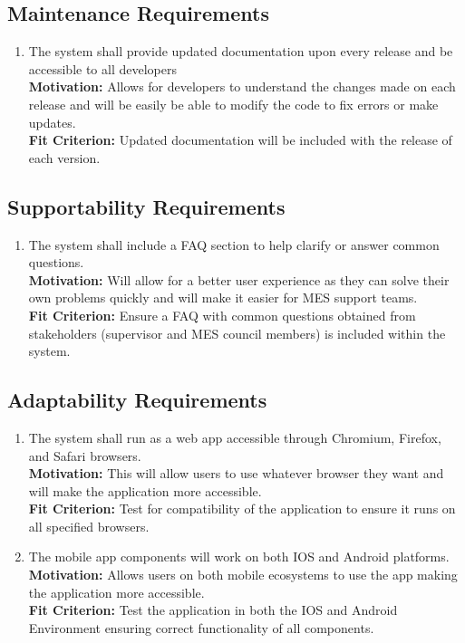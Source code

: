 \documentclass[12pt]{article}
\begin{document}
\subsection{Maintenance Requirements}
\begin{enumerate}[align=left,
  leftmargin=*,
  labelsep=1em,
  itemindent=0em,
  label=\bfseries MT-\arabic*:]
  \item The system shall provide updated documentation upon every release and be accessible to all developers\\[2mm]
    {\bf Motivation:} Allows for developers to understand the changes made on each release and will be easily be able to modify the code to fix errors or make updates. \\
    {\bf Fit Criterion:} Updated documentation will be included with the release of each version.
\end{enumerate}
\subsection{Supportability Requirements}
\begin{enumerate}[align=left,
  leftmargin=*,
  labelsep=1em,
  itemindent=0em,
  label=\bfseries SU-\arabic*:]
  \item The system shall include a FAQ section to help clarify or answer common questions.\\[2mm]
    {\bf Motivation:} Will allow for a better user experience as they can solve their own problems quickly and will make it easier for MES support teams. \\
    {\bf Fit Criterion:} Ensure a FAQ with common questions obtained from stakeholders (supervisor and MES council members) is included within the system.
\end{enumerate}
\subsection{Adaptability Requirements}
\begin{enumerate}[align=left,
  leftmargin=*,
  labelsep=1em,
  itemindent=0em,
  label=\bfseries AD-\arabic*:]
  \item The system shall run as a web app accessible through Chromium, Firefox, and Safari browsers. \\[2mm]
    {\bf Motivation:} This will allow users to use whatever browser they want and will make the application more accessible. \\
    {\bf Fit Criterion:} Test for compatibility of the application to ensure it runs on all specified browsers.
  \item The mobile app components will work on both IOS and Android platforms. \\[2mm]
    {\bf Motivation:} Allows users on both mobile ecosystems to use the app making the application more accessible. \\
    {\bf Fit Criterion:} Test the application in both the IOS and Android Environment ensuring correct functionality of all components.
\end{enumerate}
\end{document}
